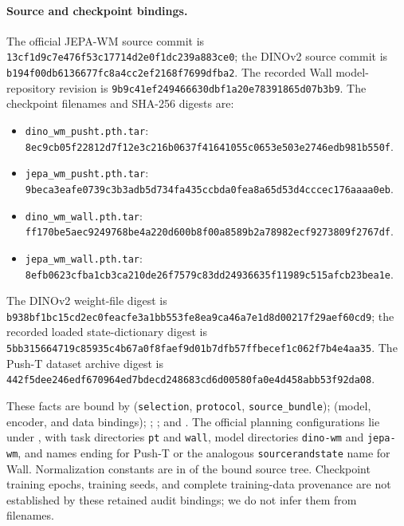 \paragraph{Source and checkpoint bindings.}
The official JEPA-WM source commit is
\nolinkurl{13cf1d9c7e476f53c17714d2e0f1dc239a883ce0};
the DINOv2 source commit is
\nolinkurl{b194f00db6136677fc8a4cc2ef2168f7699dfba2}.
The recorded Wall model-repository revision is
\nolinkurl{9b9c41ef249466630dbf1a20e78391865d07b3b9}.
The checkpoint filenames and SHA-256 digests are:
\begin{itemize}
\item \texttt{dino\_wm\_pusht.pth.tar}:\\
\texttt{8ec9cb05f22812d7f12e3c216b0637f4}\allowbreak\texttt{1641055c0653e503e2746edb981b550f}.
\item \texttt{jepa\_wm\_pusht.pth.tar}:\\
\texttt{9beca3eafe0739c3b3adb5d734fa435c}\allowbreak\texttt{cbda0fea8a65d53d4cccec176aaaa0eb}.
\item \texttt{dino\_wm\_wall.pth.tar}:\\
\texttt{ff170be5aec9249768be4a220d600b8f}\allowbreak\texttt{00a8589b2a78982ecf9273809f2767df}.
\item \texttt{jepa\_wm\_wall.pth.tar}:\\
\texttt{8efb0623cfba1cb3ca210de26f7579c8}\allowbreak\texttt{3dd24936635f11989c515afcb23bea1e}.
\end{itemize}
The DINOv2 weight-file digest is
\texttt{b938bf1bc15cd2ec0feacfe3a1bb553f}\allowbreak\texttt{e8ea9ca46a7e1d8d00217f29aef60cd9};
the recorded loaded state-dictionary digest is
\texttt{5bb315664719c85935c4b67a0f8faef9}\allowbreak\texttt{d01b7dfb57ffbecef1c062f7b4e4aa35}.
The Push-T dataset archive digest is
\texttt{442f5dee246edf670964ed7bdecd2486}\allowbreak\texttt{83cd6d00580fa0e4d458abb53f92da08}.

These facts are bound by
(\texttt{selection}, \texttt{protocol}, \texttt{source\_bundle});
(model, encoder, and data bindings);
;
; and
.
The official planning configurations lie under
, with task directories \texttt{pt}
and \texttt{wall}, model directories \texttt{dino-wm} and \texttt{jepa-wm},
and names ending
for Push-T or the analogous \texttt{sourcerandstate} name for Wall.
Normalization constants are in
 of the bound source tree.
Checkpoint training epochs, training seeds, and complete training-data
provenance are not established by these retained audit bindings; we do not
infer them from filenames.

